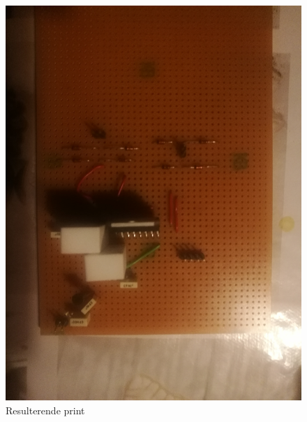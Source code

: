 \begin{figure}[H]
	\centering
	\includegraphics[scale=0.1,trim=0 0 0 0, clip]{billeder/solderedprint.jpg}
	\caption{Resulterende print}
	\label{solderedprint}
\end{figure}
